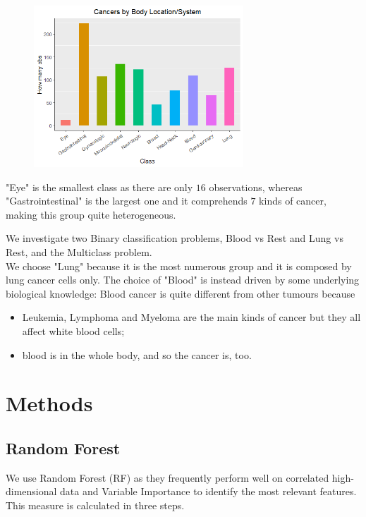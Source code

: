 \documentclass[a4paper,11pt, oneside]{article}  %
\begin{document}
\begin{figure}
	\includegraphics[width=0.7\textwidth]{plot1.png}
	\label{fig1}
\end{figure}
"Eye" is the smallest class as there are only $16$ observations, whereas "Gastrointestinal" is the largest one and it comprehends $7$ kinds of cancer,  making this group quite heterogeneous. 

We investigate two Binary classification problems,  Blood vs Rest and Lung vs Rest, and the Multiclass problem. \\
We choose "Lung" because it is the most numerous group and it is composed by lung cancer cells only.  The choice of "Blood" is instead driven by some underlying biological knowledge: Blood cancer is quite different from other tumours because
\begin{itemize}
	\item Leukemia, Lymphoma and Myeloma are the main kinds of cancer but they all affect white blood cells;
	\item blood is in the whole body, and so the cancer is, too.
\end{itemize} 

\section{Methods}
\subsection{Random Forest}
We use Random Forest (RF) as they frequently perform well on correlated high-dimensional data and Variable Importance to identify the most relevant features. This measure is calculated in three steps.  
\end{document}
